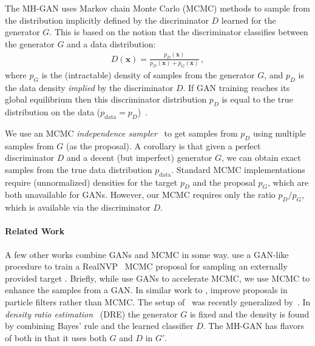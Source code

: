 \documentclass{article}
\renewcommand{\vec}[1]{{\boldsymbol{\mathbf{#1}}}} %
\newcommand{\target}{{p^\star}}
\newcommand{\PG}{{p_G}}
\newcommand{\PD}{{p_D}}
\newcommand{\PR}{{p_{\textrm{data}}}}
\begin{document}
The MH-GAN uses Markov chain Monte Carlo (MCMC) methods to sample from the distribution implicitly defined by the discriminator $D$ learned for the generator $G$.
This is based on the notion that the discriminator classifies between the generator $G$ and a data distribution:
\begin{align}
  D(\vec x) = \frac{\PD(\vec x)}{\PD(\vec x) + \PG(\vec x)}\,, \label{eq:define PD}
\end{align}
where $\PG$ is the (intractable) density of samples from the generator $G$, and $\PD$ is the data density \emph{implied} by the discriminator $D$.
If GAN training reaches its global equilibrium then this discriminator distribution $\PD$ is equal to the true distribution on the data ($\PR = \PD$)~\citep{Goodfellow2014}.

We use an MCMC \emph{independence sampler}~\citep{Tierney1994} to get samples from $\PD$ using multiple samples from $G$ (as the proposal)\@.
A corollary is that given a perfect discriminator $D$ and a decent (but imperfect) generator $G$, we can obtain exact samples from the true data distribution $\PR$.
Standard MCMC implementations require (unnormalized) densities for the target $\PD$ and the proposal $\PG$, which are both unavailable for GANs.
However, our MCMC requires only the ratio $\PD / \PG$, which is available via the discriminator $D$.

\paragraph{Related Work}
A few other works combine GANs and MCMC in some way.
\citet{Song2017} use a GAN-like procedure to train a RealNVP~\citep{Dinh2016} MCMC proposal for sampling an externally provided target \smash{$\target$}.
Briefly, while \citet{Song2017} use GANs to accelerate MCMC, we use MCMC to enhance the samples from a GAN\@.
In similar work to \cite{Song2017}, \citet{Kempinska2017} improve proposals in particle filters rather than MCMC\@.
The setup of~\citet{Song2017} was recently generalized by~\citet{Neklyudov2018}.
In \emph{density ratio estimation}~\citep{Sugiyama2012} (DRE) the generator $G$ is fixed and the density is found by combining Bayes' rule and the learned classifier $D$.
The MH-GAN has flavors of both in that it uses both $G$ and $D$ in $G'$.
\end{document}
